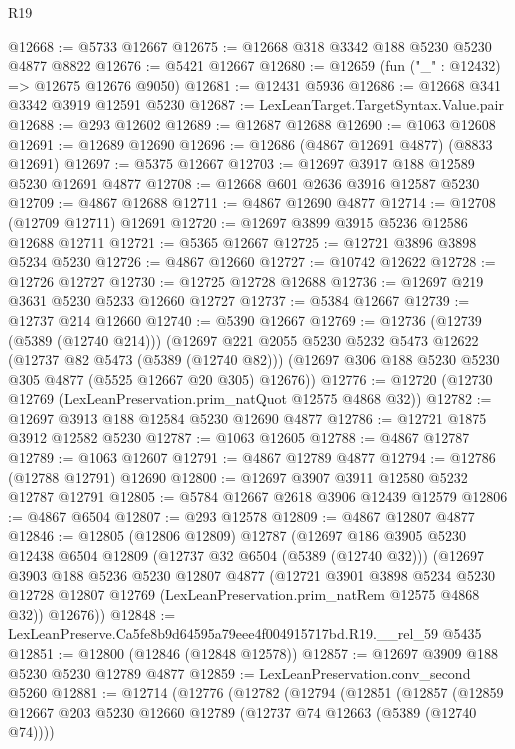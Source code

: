 \begin{lexlean}{R19}
\begin{coremodule}
@12668 := @5733 @12667
@12675 := @12668 @318 @3342 @188 @5230 @5230 @4877 @8822
@12676 := @5421 @12667
@12680 := @12659 (fun ("_" : @12432) => @12675 @12676 @9050)
@12681 := @12431 @5936
@12686 := @12668 @341 @3342 @3919 @12591 @5230
@12687 := LexLeanTarget.TargetSyntax.Value.pair
@12688 := @293 @12602
@12689 := @12687 @12688
@12690 := @1063 @12608
@12691 := @12689 @12690
@12696 := @12686 (@4867 @12691 @4877) (@8833 @12691)
@12697 := @5375 @12667
@12703 := @12697 @3917 @188 @12589 @5230 @12691 @4877
@12708 := @12668 @601 @2636 @3916 @12587 @5230
@12709 := @4867 @12688
@12711 := @4867 @12690 @4877
@12714 := @12708 (@12709 @12711) @12691
@12720 := @12697 @3899 @3915 @5236 @12586 @12688 @12711
@12721 := @5365 @12667
@12725 := @12721 @3896 @3898 @5234 @5230
@12726 := @4867 @12660
@12727 := @10742 @12622
@12728 := @12726 @12727
@12730 := @12725 @12728 @12688
@12736 := @12697 @219 @3631 @5230 @5233 @12660 @12727
@12737 := @5384 @12667
@12739 := @12737 @214 @12660
@12740 := @5390 @12667
@12769 := @12736
    (@12739 (@5389 (@12740 @214)))
    (@12697
      @221
      @2055
      @5230
      @5232
      @5473
      @12622
      (@12737 @82 @5473 (@5389 (@12740 @82)))
      (@12697 @306 @188 @5230 @5230 @305 @4877 (@5525 @12667 @20 @305) @12676))
@12776 := @12720 (@12730 @12769 (LexLeanPreservation.prim_natQuot @12575 @4868 @32))
@12782 := @12697 @3913 @188 @12584 @5230 @12690 @4877
@12786 := @12721 @1875 @3912 @12582 @5230
@12787 := @1063 @12605
@12788 := @4867 @12787
@12789 := @1063 @12607
@12791 := @4867 @12789 @4877
@12794 := @12786 (@12788 @12791) @12690
@12800 := @12697 @3907 @3911 @12580 @5232 @12787 @12791
@12805 := @5784 @12667 @2618 @3906 @12439 @12579
@12806 := @4867 @6504
@12807 := @293 @12578
@12809 := @4867 @12807 @4877
@12846 := @12805
    (@12806 @12809)
    @12787
    (@12697
      @186
      @3905
      @5230
      @12438
      @6504
      @12809
      (@12737 @32 @6504 (@5389 (@12740 @32)))
      (@12697
        @3903
        @188
        @5236
        @5230
        @12807
        @4877
        (@12721
          @3901
          @3898
          @5234
          @5230
          @12728
          @12807
          @12769
          (LexLeanPreservation.prim_natRem @12575 @4868 @32))
        @12676))
@12848 := LexLeanPreserve.Ca5fe8b9d64595a79eee4f004915717bd.R19.__rel_59 @5435
@12851 := @12800 (@12846 (@12848 @12578))
@12857 := @12697 @3909 @188 @5230 @5230 @12789 @4877
@12859 := LexLeanPreservation.conv_second @5260
@12881 := @12714
    (@12776
      (@12782
        (@12794
          (@12851
            (@12857
              (@12859 @12667 @203 @5230 @12660 @12789 (@12737 @74 @12663 (@5389 (@12740 @74))))

\end{coremodule}
\end{lexlean}
